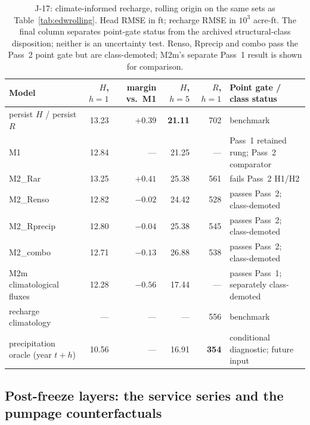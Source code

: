 \documentclass[preprint,11pt,authoryear]{elsarticle}
\theoremstyle{definition}
\theoremstyle{remark}
\begin{document}
\begin{table}[!htb]
\centering\scriptsize\setlength{\tabcolsep}{2pt}
\caption{J-17: climate-informed recharge, rolling origin on the same sets as Table~\ref{tab:edwrolling}. Head RMSE in ft; recharge RMSE in $10^3$ acre-ft. The final column separates point-gate status from the archived structural-class disposition; neither is an uncertainty test. Renso, Rprecip and combo pass the Pass~2 point gate but are class-demoted; M2m's separate Pass~1 result is shown for comparison.}
\label{tab:edwclimate}
\begin{tabularx}{\textwidth}{@{}>{\raggedright\arraybackslash}p{}rrrr>{\raggedright\arraybackslash}X@{}}
\toprule
Model & $H$, $h{=}1$ & margin vs.\ M1 & $H$, $h{=}5$ & $R$, $h{=}1$ & Point gate / class status \\
\midrule
persist $H$ / persist $R$ & 13.23 & $+0.39$ & \textbf{21.11} & 702 & benchmark \\
M1 & 12.84 & --- & 21.25 & --- & Pass~1 retained rung; Pass~2 comparator \\
M2\_Rar & 13.25 & $+0.41$ & 25.38 & 561 & fails Pass~2 H1/H2 \\
M2\_Renso & 12.82 & $-0.02$ & 24.42 & 528 & passes Pass~2; class-demoted \\
M2\_Rprecip & 12.80 & $-0.04$ & 25.38 & 545 & passes Pass~2; class-demoted \\
M2\_combo & 12.71 & $-0.13$ & 26.88 & 538 & passes Pass~2; class-demoted \\
M2m climatological fluxes & 12.28 & $-0.56$ & 17.44 & --- & passes Pass~1; separately class-demoted \\
recharge climatology & --- & --- & --- & 556 & benchmark \\
precipitation oracle (year $t{+}h$) & 10.56 & --- & 16.91 & \textbf{354} & conditional diagnostic; future input \\
\bottomrule
\end{tabularx}
\end{table}

\subsection{Post-freeze layers: the service series and the pumpage counterfactuals}\label{sec:edw_post}
\end{document}
